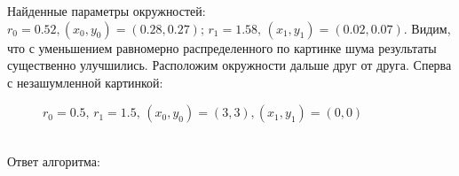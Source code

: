 Найденные параметры окружностей: $r_0 = 0.52, (x_0, y_0) = (0.28, 0.27); \, r_1 = 1.58, \, (x_1, y_1) = (0.02, 0.07)$. Видим, что с уменьшением равномерно распределенного по картинке шума результаты существенно улучшились. \newpage 
Расположим окружности дальше друг от друга. Сперва с незашумленной картинкой: \\
\begin{figure}[h]
\caption{$r_0 = 0.5, \, r_1 = 1.5, \, (x_0, y_0) = (3, 3), (x_1, y_1) = (0, 0)$}
\end{figure} \\
Ответ алгоритма: \\
\begin{figure}[h]
\end{figure}\\
